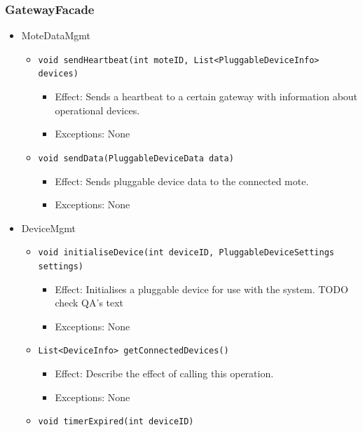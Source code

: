     \subsubsection{GatewayFacade}
    \begin{itemize}
        \item MoteDataMgmt
        \begin{itemize}
            \item \texttt{void sendHeartbeat(int moteID, List<PluggableDeviceInfo> devices)}
            \begin{itemize}
                \item Effect: Sends a heartbeat to a certain gateway with information about operational devices.
                \item Exceptions: None
            \end{itemize}
            \item \texttt{void sendData(PluggableDeviceData data)}
            \begin{itemize}
                \item Effect: Sends pluggable device data to the connected mote.
                \item Exceptions: None
            \end{itemize}
        \end{itemize}
        \item DeviceMgmt
        \begin{itemize}
            \item \texttt{void initialiseDevice(int deviceID, PluggableDeviceSettings settings)}
            \begin{itemize}
                \item Effect: Initialises a pluggable device for use with the system. TODO check QA's text
                \item Exceptions: None
            \end{itemize}
            \item \texttt{List<DeviceInfo> getConnectedDevices()}
            \begin{itemize}
                \item Effect: Describe the effect of calling this operation.
                \item Exceptions: None
            \end{itemize}
            \item \texttt{void timerExpired(int deviceID)}
            \begin{itemize}

\end{itemize}
\end{itemize}
\end{itemize}
